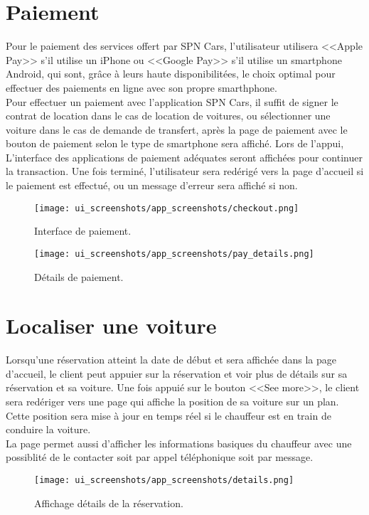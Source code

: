 \section{Paiement}
Pour le paiement des services offert par SPN Cars, l'utilisateur utilisera <<Apple Pay>> s'il utilise un iPhone ou <<Google Pay>> s'il utilise un smartphone Android, qui sont, grâce à leurs haute disponibilitées, le choix optimal pour effectuer des paiements en ligne avec son propre smarthphone.\\
Pour effectuer un paiement avec l'application SPN Cars, il suffit de signer le contrat de location dans le cas de location de voitures, ou sélectionner une voiture dans le cas de demande de transfert, après la page de paiement avec le bouton de paiement selon le type de smartphone sera affiché. Lors de l'appui, L'interface des applications de paiement adéquates seront affichées pour continuer la transaction. Une fois terminé, l'utilisateur sera redérigé vers la page d'accueil si le paiement est effectué, ou un message d'erreur sera affiché si non.
\vspace{1cm}

\begin{multicols}{2}
    \begin{figure}[H]
        \centering
        \texttt{[image: ui\_screenshots/app\_screenshots/checkout.png]}
        \captionsetup{justification=centering}
        \caption{Interface de paiement.}
        \label{fig:checkout}
    \end{figure}
    \begin{figure}[H]
        \centering
        \texttt{[image: ui\_screenshots/app\_screenshots/pay\_details.png]}
        \captionsetup{justification=centering}
        \caption{Détails de paiement.}
        \label{fig:pay_details}
    \end{figure}
\end{multicols}
\section{Localiser une voiture}
Lorsqu'une réservation atteint la date de début et sera affichée dans la page d'accueil, le client peut appuier sur la réservation et voir plus de détails sur sa réservation et sa voiture. Une fois appuié sur le bouton <<See more>>, le client sera redériger vers une page qui affiche la position de sa voiture sur un plan. Cette position sera mise à jour en temps réel si le chauffeur est en train de conduire la voiture.\\
\noindent La page permet aussi d'afficher les informations basiques du chauffeur avec une possiblité de le contacter soit par appel téléphonique soit par message.
\begin{figure}[H]
    \centering
    \texttt{[image: ui\_screenshots/app\_screenshots/details.png]}
    \captionsetup{justification=centering}
    \caption{Affichage détails de la réservation.}
    \label{fig:res_details}
\end{figure}
